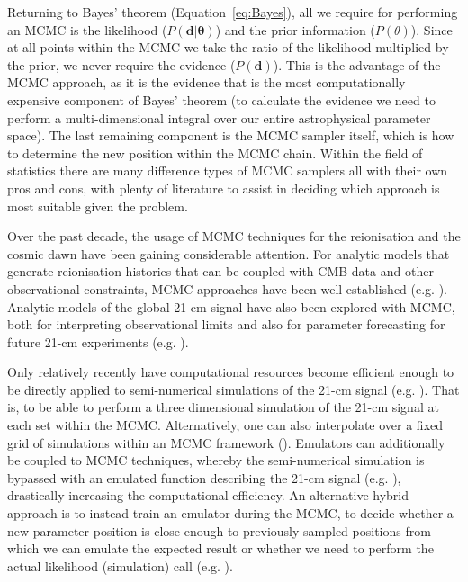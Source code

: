 Returning to Bayes' theorem (Equation~\ref{eq:Bayes}), all we require for performing an MCMC is the likelihood ($P(\mathbf{\mathbf{d}|\theta})$) and the prior information ($P(\theta)$). Since at all points within the MCMC we take the ratio of the likelihood multiplied by the prior, we never require the evidence ($P(\mathbf{d})$). This is the advantage of the MCMC approach, as it is the evidence that is the most computationally expensive component of Bayes' theorem (to calculate the evidence we need to perform a multi-dimensional integral over our entire astrophysical parameter space). The last remaining component is the MCMC sampler itself, which is how to determine the new position within the MCMC chain. Within the field of statistics there are many difference types of MCMC samplers all with their own pros and cons, with plenty of literature to assist in deciding which approach is most suitable given the problem.

Over the past decade, the usage of MCMC techniques for the reionisation and the cosmic dawn have been gaining considerable attention. For analytic models that generate reionisation histories that can be coupled with CMB data and other observational constraints, MCMC approaches have been well established (e.g. \cite{Pritchard:2010b,Clesse:2012,Morandi:2012,Mitra:2015,Gorce:2018,Finkelstein:2019,Mason:2019,Naidu:2019}). Analytic models of the global 21-cm signal have also been explored with MCMC, both for interpreting observational limits and also for parameter forecasting for future 21-cm experiments (e.g. \cite{Pritchard:2010a,Harker:2012,Mirocha:2015,Bernardi:2016,Harker:2016}).

Only relatively recently have computational resources become efficient enough to be directly applied to semi-numerical simulations of the 21-cm signal (e.g. \cite{Greig:2015,Greig:2017b,Greig:2018,Greig:2019,Park:2019}). That is, to be able to perform a three dimensional simulation of the 21-cm signal at each set within the MCMC. Alternatively, one can also interpolate over a fixed grid of simulations within an MCMC framework (\cite{Hassan:2017}). Emulators can additionally be coupled to MCMC techniques, whereby the semi-numerical simulation is bypassed with an emulated function describing the 21-cm signal (e.g. \cite{Kern:2017,Schmit:2018}), drastically increasing the computational efficiency. An alternative hybrid approach is to instead train an emulator during the MCMC, to decide whether a new parameter position is close enough to previously sampled positions from which we can emulate the expected result or whether we need to perform the actual likelihood (simulation) call (e.g. \cite{vanderVelden:2019}).

